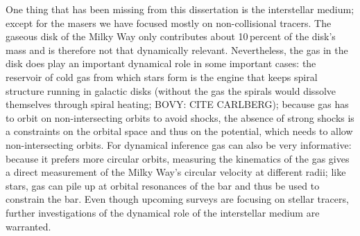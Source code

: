 One thing that has been missing from this dissertation is the
interstellar medium; except for the masers we have focused mostly on
non-collisional tracers. The gaseous disk of the Milky Way only
contributes about 10\,percent of the disk's mass and is therefore not
that dynamically relevant. Nevertheless, the gas in the disk does play
an important dynamical role in some important cases: the reservoir of
cold gas from which stars form is the engine that keeps spiral
structure running in galactic disks (without the gas the spirals would
dissolve themselves through spiral heating; BOVY: CITE CARLBERG);
because gas has to orbit on non-intersecting orbits to avoid shocks,
the absence of strong shocks is a constraints on the orbital space and
thus on the potential, which needs to allow non-intersecting
orbits. For dynamical inference gas can also be very informative:
because it prefers more circular orbits, measuring the kinematics of
the gas gives a direct measurement of the Milky Way's circular
velocity at different radii; like stars, gas can pile up at orbital
resonances of the bar and thus be used to constrain the bar. Even
though upcoming surveys are focusing on stellar tracers, further
investigations of the dynamical role of the interstellar medium are
warranted.
